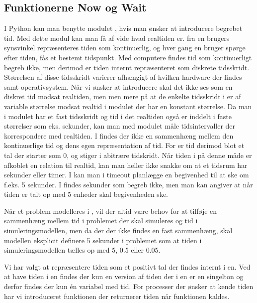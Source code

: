 \subsection{Funktionerne Now og Wait}\label{sec:Wait}
 I Python kan man benytte modulet 
, hvis man ønsker at introducere begrebet tid. Med dette
modul kan man få af vide hvad realtiden er. fra en brugers synsvinkel
repræsenteres tiden som kontinuerlig, og hver gang en bruger spørge
efter tiden, fås et bestemt tidspunkt. Med computere findes tid som
kontinuerligt begreb ikke, men derimod er tiden internt repræsenteret
som diskrete tidsskridt. Størrelsen af disse tidsskridt varierer
afhængigt af hvilken hardware der findes samt operativsystem.
Når vi ønsker at introducere \des skal det ikke ses som en diskret
tid modsat realtiden, men men mere på at de enkelte tidsskridt i \des er af
variable størrelse modsat  realtid i  modulet  der har en konstant
størrelse. Da man i  modulet har et fast tidsskridt og
tid i det realtiden også er inddelt i faste størrelser
som eks. sekunder, kan man med  modulet måle tidsintervaller der
korrespondere med realtiden. I \des findes der ikke en
sammenhæng mellem den kontinuerlige tid og dens egen repræsentation af
tid. For \des er tid derimod blot et tal der starter som 0, og stiger
i abitrære tidskridt. Når tiden i \des på denne måde er afkoblet
en relation til realtid, kan man heller ikke snakke om at et tidsrum
har sekunder eller timer. I \pycsp kan man i timeout planlægge en
begivenhed til at ske om f.eks. 5 sekunder. I \des findes sekunder som
begreb ikke, men man kan angiver at når tiden  er talt op med 5 enheder skal
begivenheden ske. 

Når et problem modelleres i \des, vil der altid være behov for at
tilføje en sammenhæng mellem tid i problemet der skal simuleres og tid i simuleringsmodellen, men da
der der ikke findes en fast sammenhæng, skal modellen  eksplicit
definere 5 sekunder i problemet som at tiden i simuleringsmodellen tælles op med 5, 0.5 eller 0.05.

Vi har valgt at repræsentere tiden som et positivt tal der findes internt i \sched en.
Ved at have tiden i  \sched en findes der kun en version af tiden der i \sched en er en singelton og derfor findes der kun
én variabel med tid. For processer der ønsker at kende tiden har vi
introduceret funktionen  der returnerer tiden når funktionen kaldes. 

